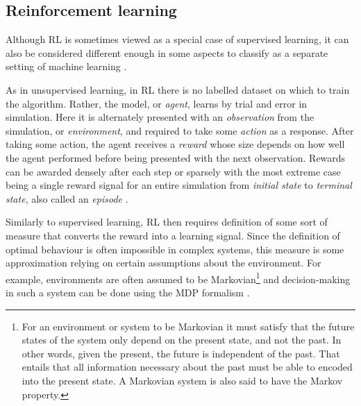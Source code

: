 \subsection{Reinforcement learning}
Although \gls{RL} is sometimes viewed as a special case of supervised learning, it can also be considered different enough in some aspects to classify as a separate setting of machine learning \cite{Sutton1998}.

As in unsupervised learning, in \gls{RL} there is no labelled dataset on which to train the algorithm. Rather, the model, or \textit{agent}, learns by trial and error in simulation. Here it is alternately presented with an \textit{observation} from the simulation, or \textit{environment}, and required to take some \textit{action} as a response. After taking some action, the agent receives a \textit{reward} whose size depends on how well the agent performed before being presented with the next observation. Rewards can be awarded densely after each step or sparsely with the most extreme case being a single reward signal for an entire simulation from \textit{initial state} to \textit{terminal state}, also called an \textit{episode} \cite{Sutton1998}.

Similarly to supervised learning, \gls{RL} then requires definition of some sort of measure that converts the reward into a learning signal. Since the definition of optimal behaviour is often impossible in complex systems, this measure is some approximation relying on certain assumptions about the environment. For example, environments are often assumed to be Markovian\footnote{For an environment or system to be Markovian it must satisfy that the future states of the system only depend on the present state, and not the past. In other words, given the present, the future is independent of the past. That entails that all information necessary about the past must be able to encoded into the present state. A Markovian system is also said to have the Markov property.} and decision-making in such a system can be done using the \gls{MDP} formalism \cite{Sutton1998}.

